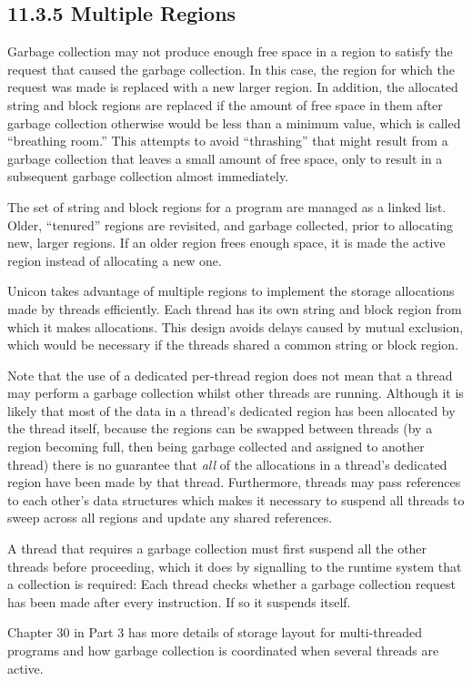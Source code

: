 \subsection[11.3.5 Multiple Regions]{11.3.5 Multiple Regions}

Garbage collection may not produce enough free space in a region to
satisfy the request that caused the garbage collection. In this case,
the region for which the request was made is replaced with a new
larger region. In addition, the allocated string and block regions are
replaced if the amount of free space in them after garbage collection
otherwise would be less than a minimum value, which is called
``breathing room.'' This attempts to avoid ``thrashing'' that might
result from a garbage collection that leaves a small amount of free
space, only to result in a subsequent garbage collection almost
immediately.

The set of string and block regions for a program are managed as a
linked list. Older, ``tenured'' regions are revisited, and garbage
collected, prior to allocating new, larger regions. If an older region
frees enough space, it is made the active region instead of allocating
a new one.

{\color{blue}
Unicon takes advantage of multiple regions to implement the storage
allocations made by threads efficiently.  Each thread has its own
string and block region from which it makes allocations. This design
avoids delays caused by mutual exclusion, which would be necessary if
the threads shared a common string or block region.

Note that the use of a dedicated per-thread region does not mean that
a thread may perform a garbage collection whilst other threads are
running. Although it is likely that most of the data in a thread's
dedicated region has been allocated by the thread itself, because the
regions can be swapped between threads (by a region becoming full,
then being garbage collected and assigned to another thread) there is
no guarantee that {\em all} of the allocations in a thread's dedicated
region have been made by that thread. Furthermore, threads may pass references
to each other's data structures which makes it necessary to suspend all
threads to sweep across all regions and update any shared references.

A thread that requires a garbage collection must first suspend all the
other threads before proceeding, which it does by signalling to the
runtime system that a collection is required: Each thread checks
whether a garbage collection request has been made after every
instruction. If so it suspends itself.

Chapter 30 in Part 3 has more details of storage layout for
multi-threaded programs and how garbage collection is coordinated
when several threads are active.
}

